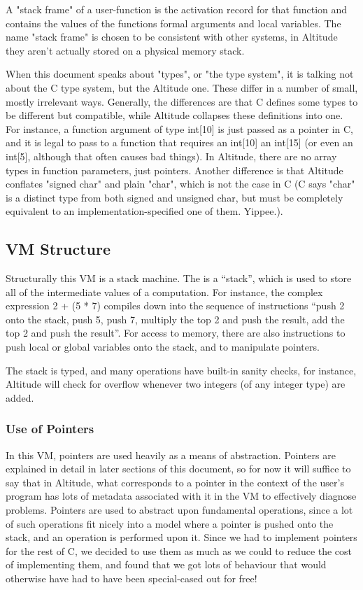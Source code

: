 \documentclass[10pt,a4paper]{report}
\begin{document}
A "stack frame" of a user-function is the activation record for that function and contains the values of the functions formal arguments and local variables. The name "stack frame" is chosen to be consistent with other systems, in Altitude they aren't actually stored on a physical memory stack.

When this document speaks about "types", or "the type system", it is talking not about the C type system, but the Altitude one. These differ in a number of small, mostly irrelevant ways. Generally, the differences are that C defines some types to be different but compatible, while Altitude collapses these definitions into one. For instance, a function argument of type int[10] is just passed as a pointer in C, and it is legal to pass to a function that requires an int[10] an int[15] (or even an int[5], although that often causes bad things). In Altitude, there are no array types in function parameters, just pointers. Another difference is that Altitude conflates "signed char" and plain "char", which is not the case in C (C says "char" is a distinct type from both signed and unsigned char, but must be completely equivalent to an implementation-specified one of them. Yippee.).


\subsection{VM Structure}
Structurally this VM is a stack machine. The is a ``stack'', which is used to store all of the intermediate values of a computation. For instance, the complex expression 2 + (5 * 7) compiles down into the sequence of instructions ``push 2 onto the stack, push 5, push 7, multiply the top 2 and push the result, add the top 2 and push the result''. For access to memory, there are also instructions to push local or global variables onto the stack, and to manipulate pointers.

The stack is typed, and many operations have built-in sanity checks, for instance, Altitude will check for overflow whenever two integers (of any integer type) are added.

\subsubsection{Use of Pointers}
In this VM, pointers are used heavily as a means of abstraction. Pointers are explained in detail in later sections of this document, so for now it will suffice to say that in Altitude, what corresponds to a pointer in the context of the user's program has lots of metadata associated with it in the VM to effectively diagnose problems. Pointers are used to abstract upon fundamental operations, since a lot of such operations fit nicely into a model where a pointer is pushed onto the stack, and an operation is performed upon it. Since we had to implement pointers for the rest of C, we decided to use them as much as we could to reduce the cost of implementing them, and found that we got lots of behaviour that would otherwise have had to have been special-cased out for free!
\end{document}
